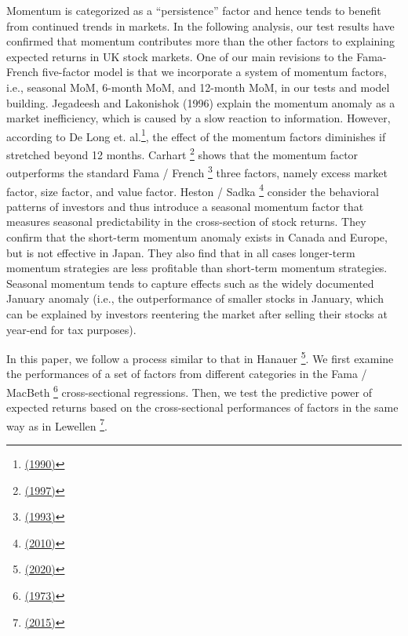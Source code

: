 \documentclass[a4paper,12pt]{article}
\begin{document}
Momentum is categorized as a ``persistence'' factor and hence tends to benefit from continued trends in markets. In the following analysis, our test results have confirmed that momentum contributes more than the other factors to explaining expected returns in UK stock markets. One of our main revisions to the Fama-French five-factor model is that we incorporate a system of momentum factors, i.e., seasonal MoM, 6-month MoM, and 12-month MoM, in our tests and model building. Jegadeesh and Lakonishok (1996) explain the momentum anomaly as a market inefficiency, which is caused by a slow reaction to information. However, according to De Long et. al.\footnote{\protect\hyperlink{ref-RN86}{(1990)}}, the effect of the momentum factors diminishes if stretched beyond 12 months. Carhart \footnote{\protect\hyperlink{ref-RN81}{(1997)}} shows that the momentum factor outperforms the standard Fama / French \footnote{\protect\hyperlink{ref-RN66}{(1993)}} three factors, namely excess market factor, size factor, and value factor. Heston / Sadka \footnote{\protect\hyperlink{ref-RN87}{(2010)}} consider the behavioral patterns of investors and thus introduce a seasonal momentum factor that measures seasonal predictability in the cross-section of stock returns. They confirm that the short-term momentum anomaly exists in Canada and Europe, but is not effective in Japan. They also find that in all cases longer-term momentum strategies are less profitable than short-term momentum strategies. Seasonal momentum tends to capture effects such as the widely documented January anomaly (i.e., the outperformance of smaller stocks in January, which can be explained by investors reentering the market after selling their stocks at year-end for tax purposes).

In this paper, we follow a process similar to that in Hanauer \footnote{\protect\hyperlink{ref-RN65}{(2020)}}. We first examine the performances of a set of factors from different categories in the Fama / MacBeth \footnote{\protect\hyperlink{ref-RN72}{(1973)}} cross-sectional regressions. Then, we test the predictive power of expected returns based on the cross-sectional performances of factors in the same way as in Lewellen \footnote{\protect\hyperlink{ref-RN46}{(2015)}}.
\end{document}
